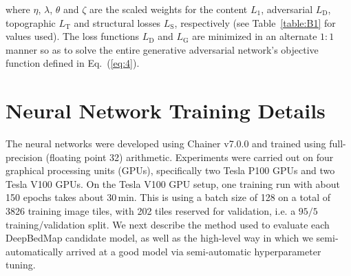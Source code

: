 where $\eta$, $\lambda$, $\theta$ and $\zeta$ are the scaled weights for the content $L_1$, adversarial $L_{\mathrm{D}}$, topographic $L_{\mathrm{T}}$ and structural losses $L_{\mathrm{S}}$, respectively (see Table~\ref{table:B1} for values used).
The loss functions $L_{\mathrm{D}}$ and $L_{\mathrm{G}}$ are minimized in an alternate $1:1$ manner so as to solve the entire generative adversarial network's objective function defined in Eq.~(\ref{eq:4}).


\chapter{Neural Network Training Details} \label{appendix:B}

The neural networks were developed using Chainer v7.0.0 \citep{TokuiChainerDeepLearning2019} and trained using full-precision (floating point 32) arithmetic.
Experiments were carried out on four graphical processing units (GPUs), specifically two Tesla P100 GPUs and two Tesla V100 GPUs.
On the Tesla V100 GPU setup, one training run with about 150 epochs takes about 30\,min.
This is using a batch size of 128 on a total of 3826 training image tiles, with 202 tiles reserved for validation, i.e. a $95/5$ training/validation split.
We next describe the method used to evaluate each DeepBedMap candidate model, as well as the high-level way in which we semi-automatically arrived at a good model via semi-automatic hyperparameter tuning.

